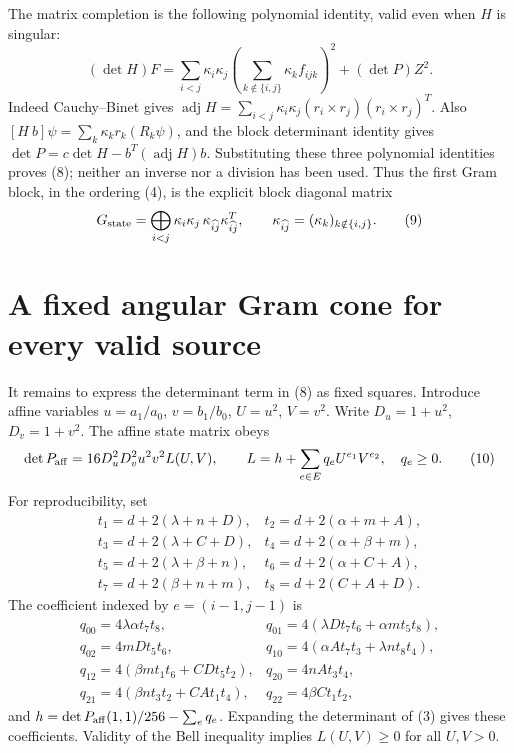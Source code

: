 \documentclass[11pt]{article}
\newcommand{\adj}{\operatorname{adj}}
\begin{document}
The matrix completion is the following polynomial identity, valid even
when $H$ is singular:
\[
 (\det H)F=
 \sum_{i<j}\kappa_i\kappa_j
       \left(\sum_{k\notin\{i,j\}}\kappa_k f_{ijk}\right)^2
                  +(\det P)Z^2.                      \tag{8}
\]
Indeed Cauchy--Binet gives
$\adj H=\sum_{i<j}\kappa_i\kappa_j
(r_i\times r_j)(r_i\times r_j)^T$.
Also $[H\ b]\psi=\sum_k\kappa_k r_k(R_k\psi)$, and the block determinant
identity gives
$\det P=c\det H-b^T(\adj H)b$.
Substituting these three polynomial identities proves (8); neither an
inverse nor a division has been used.  Thus the first Gram block, in the
ordering (4), is the explicit block diagonal matrix
\[
 G_{\rm state}=
 \bigoplus_{i<j}\kappa_i\kappa_j\,\kappa_{\widehat{ij}}
                       \kappa_{\widehat{ij}}^T,
 \qquad \kappa_{\widehat{ij}}=(\kappa_k)_{k\notin\{i,j\}}.
                                                               \tag{9}
\]

\section{A fixed angular Gram cone for every valid source}

It remains to express the determinant term in (8) as fixed squares.
Introduce affine variables
$u=a_1/a_0$, $v=b_1/b_0$, $U=u^2$, $V=v^2$.
Write $D_u=1+u^2$, $D_v=1+v^2$.  The affine state matrix obeys
\[
 \det P_{\rm aff}=16D_u^2D_v^2u^2v^2 L(U,V),
 \qquad L=h+\sum_{e\in E}q_e U^{e_1}V^{e_2},\quad q_e\geq0.
                                                               \tag{10}
\]
For reproducibility, set
\[
\begin{array}{ll}
t_1=d+2(\lambda+n+D),&t_2=d+2(\alpha+m+A),\\
t_3=d+2(\lambda+C+D),&t_4=d+2(\alpha+\beta+m),\\
t_5=d+2(\lambda+\beta+n),&t_6=d+2(\alpha+C+A),\\
t_7=d+2(\beta+n+m),&t_8=d+2(C+A+D).
\end{array}
\]
The coefficient indexed by $e=(i-1,j-1)$ is
\[
\begin{array}{ll}
q_{00}=4\lambda\alpha t_7t_8,&
q_{01}=4(\lambda Dt_7t_6+\alpha mt_5t_8),\\
q_{02}=4mDt_5t_6,&
q_{10}=4(\alpha At_7t_3+\lambda nt_8t_4),\\
q_{12}=4(\beta mt_1t_6+CDt_5t_2),&
q_{20}=4nAt_3t_4,\\
q_{21}=4(\beta nt_3t_2+CAt_1t_4),&
q_{22}=4\beta Ct_1t_2,
\end{array}
\]
and $h=\det P_{\rm aff}(1,1)/256-\sum_e q_e$.
Expanding the determinant of (3) gives these coefficients. Validity of
the Bell inequality implies
$L(U,V)\geq0$ for all $U,V>0$.
\end{document}
